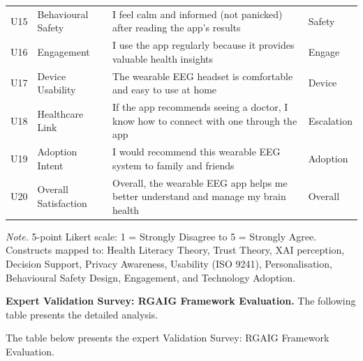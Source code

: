 \begin{table}[p]
\begin{tabularx}{\textwidth}{@{} >{\raggedright\arraybackslash}p{0.5cm} >{\raggedright\arraybackslash}p{2.2cm} L >{\raggedright\arraybackslash}p{1.5cm} @{}}
\addlinespace
U15 & Behavioural Safety & I feel calm and informed (not panicked) after reading the app's results & Safety \\
\addlinespace
U16 & Engagement & I use the app regularly because it provides valuable health insights & Engage \\
\addlinespace
U17 & Device Usability & The wearable EEG headset is comfortable and easy to use at home & Device \\
\addlinespace
U18 & Healthcare Link & If the app recommends seeing a doctor, I know how to connect with one through the app & Escalation \\
\addlinespace
U19 & Adoption Intent & I would recommend this wearable EEG system to family and friends & Adoption \\
\addlinespace
U20 & Overall Satisfaction & Overall, the wearable EEG app helps me better understand and manage my brain health & Overall \\
\bottomrule
\end{tabularx}
\vspace{0.5em}
\noindent\textit{Note.} 5-point Likert scale: 1 = Strongly Disagree to 5 = Strongly Agree. Constructs mapped to: Health Literacy Theory, Trust Theory, XAI perception, Decision Support, Privacy Awareness, Usability (ISO 9241), Personalisation, Behavioural Safety Design, Engagement, and Technology Adoption.
\end{table}



\noindent\textbf{Expert Validation Survey: RGAIG Framework Evaluation.} The following table presents the detailed analysis.

\noindent The table below presents the expert Validation Survey: RGAIG Framework Evaluation.

